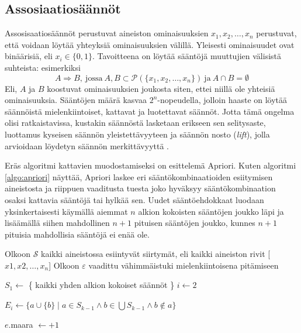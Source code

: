 \documentclass[finnish,gradu,twoside,12pt]{tktltiki}
\begin{document}
{\subsection{Assosiaatiosäännöt}

Assosisaatiosäännöt perustuvat aineiston ominaisuuksien $x_1, x_2, \ldots, x_n$ perustuvat, että voidaan löytää yhteyksiä ominaisuuksien välillä. Yleisesti ominaisuudet ovat binäärisiä, eli $x_i \in \{ 0, 1\}$. Tavoitteena on löytää sääntöjä muuttujien välisistä suhteista: esimerkiksi $$A \Rightarrow B, \mathrm{~jossa~} A, B \subset \mathcal{P}( \{ x_1, x_2, \ldots , x_n \} ) \mathrm{~ja~} A \cap B = \emptyset$$ Eli, $A$ ja $B$ koostuvat ominaisuuksien joukosta siten, ettei niillä ole yhteisiä ominaisuuksia. Sääntöjen määrä kasvaa $2^n$-nopeudella, jolloin haaste on löytää säännöistä mielenkiintoiset, kattavat ja luotettavat säännöt. Jotta tämä ongelma olisi ratkaistavissa, kustakin säännöstä lasketaan erikseen sen selitysaste, luottamus kyseisen säännön yleistettävyyteen ja säännön nosto (\textit{lift}), jolla arvioidaan löydetyn säännön merkittävyyttä \citep[485--586]{Hastie2009}.

Eräs algoritmi kattavien muodostamiseksi on \citet{Agrawal1994a} esittelemä Apriori. Kuten algoritmi \ref{algo:apriori} näyttää, Apriori laskee eri sääntökombinaatioiden esiitymisen aineistosta ja riippuen vaaditusta tuesta joko hyväksyy sääntökombinaation osaksi kattavia sääntöjä tai hylkää sen. Uudet sääntöehdokkaat luodaan yksinkertaisesti käymällä aiemmat $n$ alkion kokoisten sääntöjen joukko läpi ja lisäämällä siihen mahdollinen $n+1$ pituisen sääntöjen joukko, kunnes $n+1$ pituisia mahdollisia sääntöjä ei enää ole.

\begin{algorithm}
\begin{algorithmic}
\State Olkoon $\mathcal{S}$ kaikki aineistossa esiintyvät siirtymät, eli kaikki aineiston rivit [$x1, x2, \ldots, x_n$]
\State Olkoon $\varepsilon$ vaadittu vähimmäistuki mielenkiintoisena pitämiseen

\State $S_1 \gets $ \{ kaikki yhden alkion kokoiset säännöt \}
\State $i \gets 2$


  \State $E_i \gets \{ a \cup \{b\} \mid a \in S_{k-1} \land b \in \bigcup S_{k-1} \land b \not \in a \} $

		   \State $e$.maara $ \gets + 1$
		\EndFor


\end{algorithmic}
\end{algorithm}}
\end{document}
